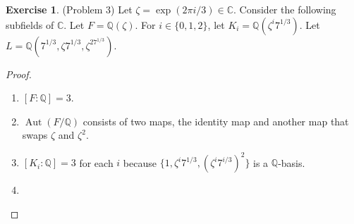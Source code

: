 \documentclass[12pt, psamsfonts]{amsart}
\theoremstyle{definition}
\newtheorem*{exer}{Exercise}
\theoremstyle{remark}
\DeclareMathOperator{\Aut}{Aut}
\numberwithin{equation}{section}
\begin{document}
\begin{exer}{(Problem 3)}
  Let $\zeta = \exp(2\pi i / 3) \in \mathbb{C}$.
  Consider the following subfields of $\mathbb{C}$.
  Let $F = \mathbb{Q}(\zeta)$.
  For $i \in \{ 0, 1, 2 \}$, let $K_i = \mathbb{Q}(\zeta^i7^{1/3})$.
  Let $L = \mathbb{Q}(7^{1/3}, \zeta7^{1/3}, \zeta^27^{1/3})$.
\end{exer}

\begin{proof}
  $ $
  \begin{enumerate}
    \item 
      $[F:\mathbb{Q}] = 3$.
    \item
      $\Aut(F/\mathbb{Q})$ consists of two maps, the identity map and another map that swaps $\zeta$ and $\zeta^2$.
    \item
      $[K_i:\mathbb{Q}] = 3$ for each $i$ because $\{ 1, \zeta^i7^{1/3}, (\zeta^{i}7^{i/3})^2 \}$ is a $\mathbb{Q}$-basis.
    \item
  \end{enumerate}
\end{proof}
\end{document}
